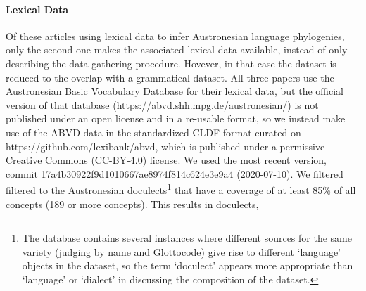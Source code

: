 \documentclass[a4paper,12pt]{scrartcl}
\begin{document}
\paragraph{Lexical Data}
Of these articles using lexical data to infer Austronesian language phylogenies, only the second one
\parencite{greenhill2018population} makes the associated lexical data available, instead of only describing the data gathering procedure.
Hovever, in that case the dataset is reduced to the overlap with a grammatical dataset.
All three papers use the Austronesian Basic Vocabulary Database for their lexical data, but the official version of that database
(https://abvd.shh.mpg.de/austronesian/) is not published under an open license and in a re-usable format, so we instead make use of the ABVD
data in the standardized CLDF format \parencite{cldf} curated on https://github.com/lexibank/abvd, which is published under a
permissive Creative Commons (CC-BY-4.0) license. We used the most recent version, commit 17a4b30922f9d1010667ae8974f814c624e3e9a4
(2020-07-10). We filtered filtered to the Austronesian doculects\footnote{The database contains several instances where different
sources for the same variety (judging by name and Glottocode) give rise to different ‘language’ objects in the dataset, so the term
‘doculect’ appears more appropriate than ‘language’ or ‘dialect’ in discussing the composition of the dataset.} that have a coverage
of at least 85\% of all concepts (189 or more concepts). This results in \countlects{} doculects, 
\end{document}

